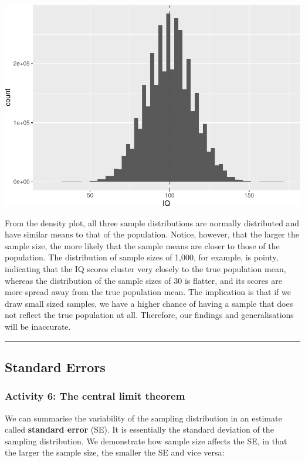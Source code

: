 \documentclass[
]{book}
\begin{document}
\includegraphics{05-inferential-statistics_files/figure-latex/unnamed-chunk-9-1.pdf}

From the density plot, all three sample distributions are normally distributed and have similar means to that of the population. Notice, however, that the larger the sample size, the more likely that the sample means are closer to those of the population. The distribution of sample sizes of 1,000, for example, is pointy, indicating that the IQ scores cluster very closely to the true population mean, whereas the distribution of the sample sizes of 30 is flatter, and its scores are more spread away from the true population mean. The implication is that if we draw small sized samples, we have a higher chance of having a sample that does not reflect the true population at all. Therefore, our findings and generalisations will be inaccurate.

\begin{center}\rule{0.5\linewidth}{0.5pt}\end{center}

\hypertarget{standard-errors}{%
\subsection{Standard Errors}\label{standard-errors}}

\hypertarget{activity-6-the-central-limit-theorem}{%
\subsubsection{Activity 6: The central limit theorem}\label{activity-6-the-central-limit-theorem}}

We can summarise the variability of the sampling distribution in an estimate called \textbf{standard error} (SE). It is essentially the standard deviation of the sampling distribution. We demonstrate how sample size affects the SE, in that the larger the sample size, the smaller the SE and vice versa:
\end{document}
